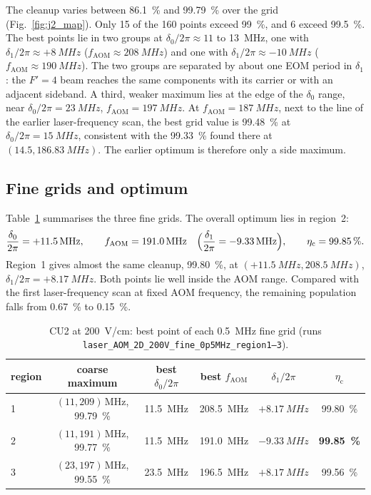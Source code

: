 \documentclass[11pt,a4paper,oneside]{report}
\newcommand{\code}[1]{\texttt{#1}}
\newcommand{\etac}{\eta_{\mathrm{c}}}
\newcommand{\fAOM}{f_{\mathrm{AOM}}}
\begin{document}
The cleanup varies between \SI{86.1}{\percent} and \SI{99.79}{\percent} over the grid
(Fig.~\ref{fig:j2_map}). Only 15 of the 160 points exceed \SI{99}{\percent}, and 6 exceed
\SI{99.5}{\percent}. The best points lie in two groups at $\delta_0/2\pi\approx\num{11}$ to
\SI{13}{MHz}, one with $\delta_1/2\pi\approx+\SI{8}{MHz}$ ($\fAOM\approx\SI{208}{MHz}$) and one
with $\delta_1/2\pi\approx-\SI{10}{MHz}$ ($\fAOM\approx\SI{190}{MHz}$). The two groups are
separated by about one EOM period in $\delta_1$: the $F'=4$ beam reaches the same components with
its carrier or with an adjacent sideband. A third, weaker maximum lies at the edge of the
$\delta_0$ range, near $\delta_0/2\pi=\SI{23}{MHz}$, $\fAOM=\SI{197}{MHz}$. At
$\fAOM=\SI{187}{MHz}$, next to the line of the earlier laser-frequency scan, the best grid value
is \SI{99.48}{\percent} at $\delta_0/2\pi=\SI{15}{MHz}$, consistent with the \SI{99.33}{\percent}
found there at $(14.5,\SI{186.83}{MHz})$. The earlier optimum is therefore only a side maximum.

\subsection{Fine grids and optimum}

Table~\ref{tab:j2_fine} summarises the three fine grids. The overall optimum lies in region~2:
\begin{equation}
  \frac{\delta_0}{2\pi}=+\SI{11.5}{MHz},\qquad \fAOM=\SI{191.0}{MHz}\quad
  \Bigl(\frac{\delta_1}{2\pi}=-\SI{9.33}{MHz}\Bigr),\qquad \etac=\SI{99.85}{\percent}.
\end{equation}
Region~1 gives almost the same cleanup, \SI{99.80}{\percent}, at
$(+\SI{11.5}{MHz},\SI{208.5}{MHz})$, $\delta_1/2\pi=+\SI{8.17}{MHz}$. Both points lie well
inside the AOM range. Compared with the first laser-frequency scan at fixed AOM frequency, the
remaining population falls from \SI{0.67}{\percent} to \SI{0.15}{\percent}.

\begin{table}[htbp]
  \centering
  \caption[CU2 at \SI{200}{V/cm}: fine grids]{CU2 at \SI{200}{V/cm}: best point of each
  \SI{0.5}{MHz} fine grid (runs \code{laser\_AOM\_2D\_200V\_fine\_0p5MHz\_region1--3}).}
  \label{tab:j2_fine}
  \small
  \begin{tabular}{lccccc}
    \toprule
    region & coarse maximum & best $\delta_0/2\pi$ & best $\fAOM$ & $\delta_1/2\pi$ & $\etac$ \\
    \midrule
    1 & $(11, 209)$\,MHz, \SI{99.79}{\percent} & \SI{11.5}{MHz} & \SI{208.5}{MHz} & $+\SI{8.17}{MHz}$ & \SI{99.80}{\percent} \\
    2 & $(11, 191)$\,MHz, \SI{99.77}{\percent} & \SI{11.5}{MHz} & \SI{191.0}{MHz} & $-\SI{9.33}{MHz}$ & \textbf{\SI{99.85}{\percent}} \\
    3 & $(23, 197)$\,MHz, \SI{99.55}{\percent} & \SI{23.5}{MHz} & \SI{196.5}{MHz} & $+\SI{8.17}{MHz}$ & \SI{99.56}{\percent} \\
    \bottomrule
  \end{tabular}
\end{table}
\end{document}

